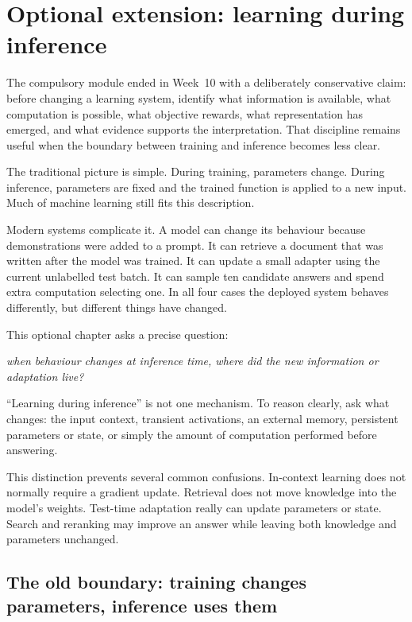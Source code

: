 \chapter{Optional extension: learning during inference}
\label{chap:week11}

The compulsory module ended in Week~10 with a deliberately conservative claim: before changing a learning system, identify what information is available, what computation is possible, what objective rewards, what representation has emerged, and what evidence supports the interpretation. That discipline remains useful when the boundary between training and inference becomes less clear.

The traditional picture is simple. During training, parameters change. During inference, parameters are fixed and the trained function is applied to a new input. Much of machine learning still fits this description.

Modern systems complicate it. A model can change its behaviour because demonstrations were added to a prompt. It can retrieve a document that was written after the model was trained. It can update a small adapter using the current unlabelled test batch. It can sample ten candidate answers and spend extra computation selecting one. In all four cases the deployed system behaves differently, but different things have changed.

This optional chapter asks a precise question:
\begin{center}
  \emph{when behaviour changes at inference time, where did the new information or adaptation live?}
\end{center}

\begin{keyidea}
``Learning during inference'' is not one mechanism. To reason clearly, ask what changes: the input context, transient activations, an external memory, persistent parameters or state, or simply the amount of computation performed before answering.
\end{keyidea}

This distinction prevents several common confusions. In-context learning does not normally require a gradient update. Retrieval does not move knowledge into the model's weights. Test-time adaptation really can update parameters or state. Search and reranking may improve an answer while leaving both knowledge and parameters unchanged.

\section{The old boundary: training changes parameters, inference uses them}

